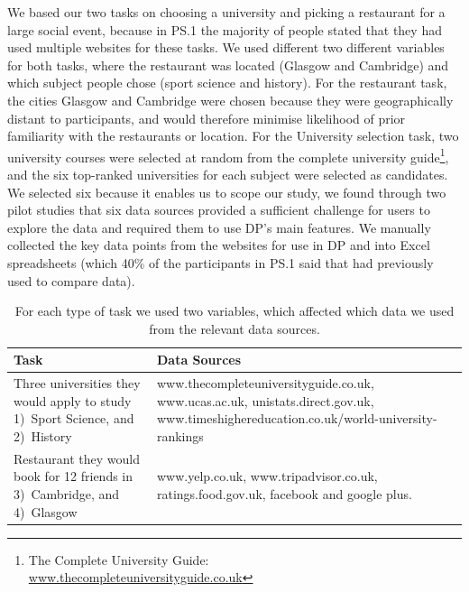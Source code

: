 \documentclass{sigchi}
\begin{document}
We based our two tasks on choosing a university and picking a restaurant for a large social event, because in PS.1 the majority of people stated that they had used multiple websites for these tasks.  We used different two different variables for both tasks, where the restaurant was located (Glasgow and Cambridge) and which subject people chose (sport science and history).  For the restaurant task, the cities Glasgow and Cambridge were chosen because they were geographically distant to participants, and would therefore minimise likelihood of prior familiarity with the restaurants or location.  For the University selection task, two university courses were selected at random from the complete university guide\footnote{The Complete University Guide:\\\url{www.thecompleteuniversityguide.co.uk}}, and the six top-ranked universities for each subject were selected as candidates.  
We selected six because it enables us to scope our study, we found through two pilot studies that six data sources provided a sufficient challenge for users to explore the data and required them to use DP's main features. We manually collected the key data points from the websites for use in DP and into Excel spreadsheets (which 40\% of the participants in PS.1 said that had previously used to compare data).

\begin{table}[htbp]
\begin{center}
\small
\begin{tabular}{|p{3cm}|p{4.7cm}|}
\hline
Task	 & Data Sources\\
\hline
Three universities they would apply to study 1)~Sport Science, and 2)~History & www.thecompleteuniversityguide.co.uk, www.ucas.ac.uk, unistats.direct.gov.uk, www.timeshighereducation.co.uk/world-university-rankings\\
\hline
Restaurant they would book for 12 friends in 3)~Cambridge, and 4)~Glasgow & www.yelp.co.uk, www.tripadvisor.co.uk, ratings.food.gov.uk, facebook and google plus.\\
\hline
\end{tabular}
\end{center}
\caption{For each type of task we used two variables, which affected which data we used from the relevant data sources.} \label{tab:studyfactors}
\normalsize
\end{table}
\end{document}
